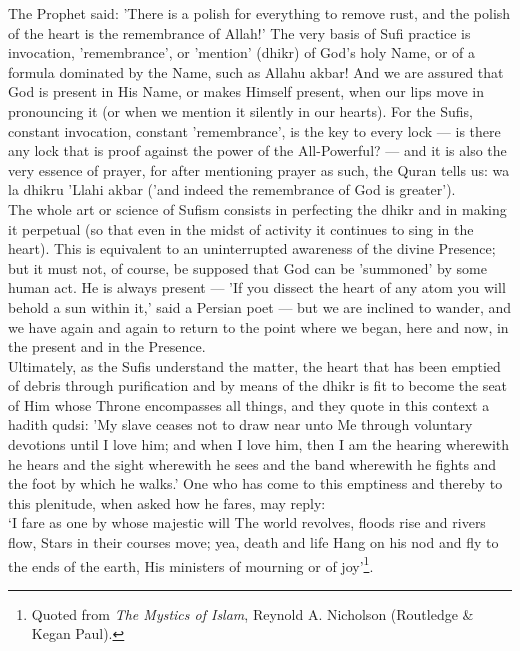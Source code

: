 \documentclass[10pt, twoside,openright]{book}
\begin{document}
The Prophet said: 'There is a polish for everything to remove rust, and the polish of the heart is 
the remembrance of Allah!' The very basis of Sufi practice is invocation, 'remembrance', or 'mention' 
(dhikr) of God's holy Name, or of a formula dominated by the Name, such as Allahu akbar! And we are 
assured that God is present in His Name, or makes Himself present, when our lips move in pronouncing 
it (or when we mention it silently in our hearts). For the Sufis, constant invocation, constant 
'remembrance', is the key to every lock --- is there any lock that is proof against the power of the 
All-Powerful? --- and it is also the very essence of prayer, for after mentioning prayer as such, the 
Quran tells us: wa la dhikru 'Llahi akbar ('and indeed the remembrance of God is greater'). \\

The whole art or science of Sufism consists in perfecting the dhikr and in making it perpetual (so 
that even in the midst of activity it continues to sing in the heart). This is equivalent to an 
uninterrupted awareness of the divine Presence; but it must not, of course, be supposed that God can 
be 'summoned' by some human act. He is always present --- 'If you dissect the heart of any atom you 
will behold a sun within it,' said a Persian poet --- but we are inclined to wander, and we have again 
and again to return to the point where we began, here and now, in the present and in the Presence. \\

Ultimately, as the Sufis understand the matter, the heart that has been emptied of debris through 
purification and by means of the dhikr is fit to become the seat of Him whose Throne encompasses all 
things, and they quote in this context a hadith qudsi: 'My slave ceases not to draw near unto Me 
through voluntary devotions until I love him; and when I love him, then I am the hearing wherewith he 
hears and the sight wherewith he sees and the band wherewith he fights and the foot by which he 
walks.' One who has come to this emptiness and thereby to this plenitude, when asked how he fares, 
may reply: \\

`I fare as one by whose majestic will The world revolves, floods rise and rivers flow, Stars in their 
courses move; yea, death and life Hang on his nod and fly to the ends of the earth, His ministers of 
mourning or of joy'\footnote{Quoted from \emph{The Mystics of Islam}, Reynold A. Nicholson (Routledge \& Kegan Paul).}.\\
\end{document}
